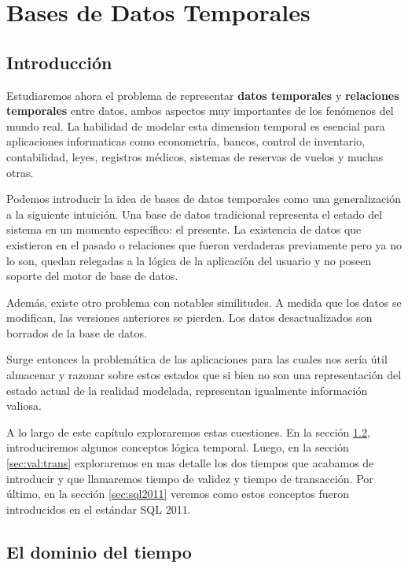 \newcommand{\concept}{\textbf}

\chapter{Bases de Datos Temporales}  \label{cap:t}

\section{Introducción}

Estudiaremos ahora el problema de representar \concept{datos temporales} y \concept{relaciones temporales} entre datos,
ambos aspectos muy importantes de los fenómenos del mundo real.
La habilidad de modelar esta dimension temporal es esencial para aplicaciones informaticas como
econometría, bancos, control de inventario, contabilidad, leyes, registros médicos, sistemas de reservas de vuelos y muchas otras.

Podemos introducir la idea de bases de datos temporales como una generalización a la siguiente intuición.
Una base de datos tradicional representa el estado del sistema en un momento específico: el presente.
La existencia de datos que existieron en el pasado o relaciones que fueron verdaderas previamente pero ya no lo son,
quedan relegadas a la lógica de la aplicación del usuario y no poseen soporte del motor de base de datos.

Además, existe otro problema con notables similitudes. A medida que los datos se modifican, las versiones anteriores se pierden.
Los datos desactualizados son borrados de la base de datos.

Surge entonces la problemática de las aplicaciones para las cuales nos sería útil almacenar y razonar sobre estos estados que
si bien no son una representación del estado actual de la realidad modelada, representan igualmente información valiosa.

A lo largo de este capítulo exploraremos estas cuestiones.
En la sección \ref{sec:dominio:tiempo}, introduciremos algunos conceptos lógica temporal.
Luego, en la sección \ref{sec:val:trans} exploraremos en mas detalle los dos tiempos que acabamos de introducir
y que llamaremos tiempo de validez y tiempo de transacción.
Por último, en la sección \ref{sec:sql2011} veremos como estos conceptos fueron introducidos en el estándar SQL 2011.

\section{El dominio del tiempo}\label{sec:dominio:tiempo}

